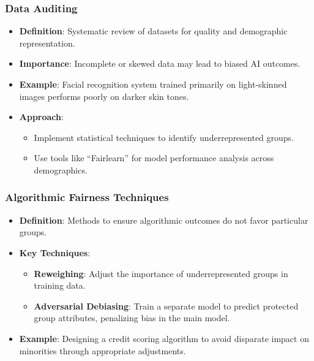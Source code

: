 \documentclass[aspectratio=169]{beamer}
\begin{document}
\begin{frame}[fragile]
    \frametitle{Data Auditing}
    \begin{itemize}
        \item \textbf{Definition}: Systematic review of datasets for quality and demographic representation.
        \item \textbf{Importance}: Incomplete or skewed data may lead to biased AI outcomes.
        \item \textbf{Example}: Facial recognition system trained primarily on light-skinned images performs poorly on darker skin tones.
        \item \textbf{Approach}:
        \begin{itemize}
            \item Implement statistical techniques to identify underrepresented groups.
            \item Use tools like ``Fairlearn'' for model performance analysis across demographics.
        \end{itemize}
    \end{itemize}
\end{frame}

\begin{frame}[fragile]
    \frametitle{Algorithmic Fairness Techniques}
    \begin{itemize}
        \item \textbf{Definition}: Methods to ensure algorithmic outcomes do not favor particular groups.
        \item \textbf{Key Techniques}:
        \begin{itemize}
            \item \textbf{Reweighing}: Adjust the importance of underrepresented groups in training data.
            \item \textbf{Adversarial Debiasing}: Train a separate model to predict protected group attributes, penalizing bias in the main model.
        \end{itemize}
        \item \textbf{Example}: Designing a credit scoring algorithm to avoid disparate impact on minorities through appropriate adjustments.
    \end{itemize}
\end{frame}
\end{document}
